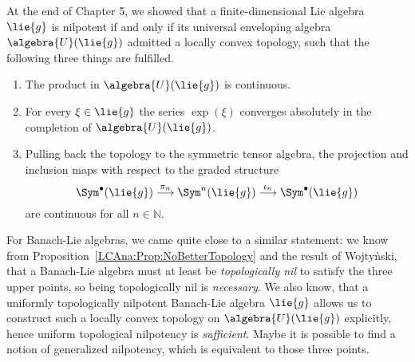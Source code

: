 At the end of Chapter 5, we showed that a finite-dimensional Lie algebra 
$\lie{g}$ is nilpotent if and only if its universal enveloping algebra 
$\algebra{U}(\lie{g})$ admitted a locally convex topology, such that the 
following three things are fulfilled.
\begin{enumerate}
	\item
	The product in $\algebra{U}(\lie{g})$ is continuous.

	\item
	For every $\xi \in \lie{g}$ the series $\exp(\xi)$ converges 
	absolutely in the completion of $\algebra{U}(\lie{g})$.

	\item
	Pulling back the topology to the symmetric tensor algebra, the projection 
	and inclusion maps with respect to the graded structure
	\begin{equation*}
		\Sym^{\bullet}(\lie{g})
    		\ot{$\pi_n$}{\longrightarrow}
   	    		\Sym^n(\lie{g})
    	    	\ot{$\iota_n$}{\longrightarrow}
    		\Sym^{\bullet}(\lie{g})
	\end{equation*}
	are continuous for all $n \in \mathbb{N}$.
\end{enumerate}
For Banach-Lie algebras, we came quite close to a similar statement: we know 
from Proposition~\ref{LCAna:Prop:NoBetterTopology} and the result of 
Wojty\`nski, that a Banach-Lie algebra must at least be \emph{topologically 
nil} to satisfy the three upper points, so being topologically nil is 
\emph{necessary}. We also know, that a uniformly topologically nilpotent 
Banach-Lie algebra $\lie{g}$ allows us to construct such a locally convex topology 
on $\algebra{U}(\lie{g})$ explicitly, hence uniform topological nilpotency is 
\emph{sufficient}. Maybe it is possible to find a notion of generalized 
nilpotency, which is equivalent to those three points.
